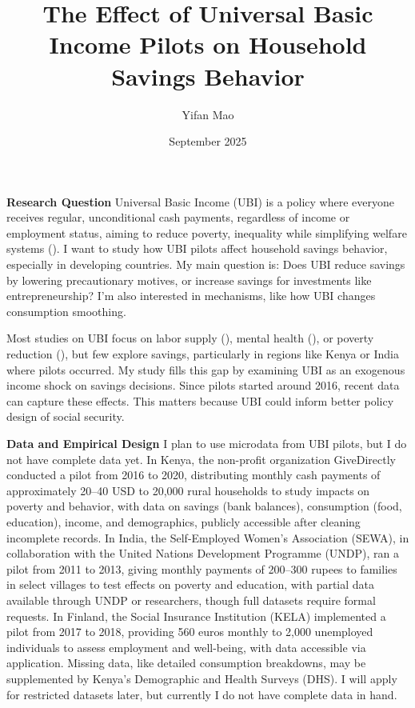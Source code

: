\documentclass[12pt]{article}
\title{The Effect of Universal Basic Income Pilots on Household Savings Behavior}
\author{Yifan Mao}
\date{September 2025}
\begin{document}
\maketitle

\textbf{Research Question}
Universal Basic Income (UBI) is a policy where everyone receives regular, unconditional cash payments, regardless of income or employment status, aiming to reduce poverty, inequality while simplifying welfare systems (\citet{hanna2018universal}). I want to study how UBI pilots affect household savings behavior, especially in developing countries. My main question is: Does UBI reduce savings by lowering precautionary motives, or increase savings for investments like entrepreneurship? I’m also interested in mechanisms, like how UBI changes consumption smoothing.

Most studies on UBI focus on labor supply (\citet{de2020there}), mental health (\citet{wilson2021mental}), or poverty reduction (\citet{hanna2018universal}), but few explore savings, particularly in regions like Kenya or India where pilots occurred. My study fills this gap by examining UBI as an exogenous income shock on savings decisions. Since pilots started around 2016, recent data can capture these effects. This matters because UBI could inform better policy design of social security.

\textbf{Data and Empirical Design}
I plan to use microdata from UBI pilots, but I do not have complete data yet. In Kenya, the non-profit organization GiveDirectly conducted a pilot from 2016 to 2020, distributing monthly cash payments of approximately 20–40 USD to 20,000 rural households to study impacts on poverty and behavior, with data on savings (bank balances), consumption (food, education), income, and demographics, publicly accessible after cleaning incomplete records. In India, the Self-Employed Women’s Association (SEWA), in collaboration with the United Nations Development Programme (UNDP), ran a pilot from 2011 to 2013, giving monthly payments of 200–300 rupees to families in select villages to test effects on poverty and education, with partial data available through UNDP or researchers, though full datasets require formal requests. In Finland, the Social Insurance Institution (KELA) implemented a pilot from 2017 to 2018, providing 560 euros monthly to 2,000 unemployed individuals to assess employment and well-being, with data accessible via application. Missing data, like detailed consumption breakdowns, may be supplemented by Kenya’s Demographic and Health Surveys (DHS). I will apply for restricted datasets later, but currently I do not have complete data in hand.
\end{document}
